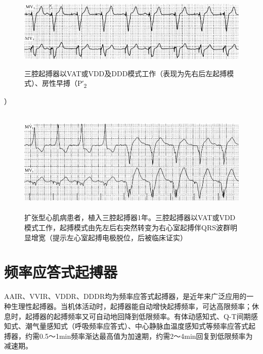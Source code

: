 \begin{figure}[!htbp]
 \centering
 \includegraphics[width=5.58333in,height=1.42708in]{./images/Image00641.jpg}
 \captionsetup{justification=centering}
 \caption{三腔起搏器以VAT或VDD及DDD模式工作（表现为先右后左起搏模式）、房性早搏（P′\textsubscript{2}}
 \label{fig38-38}
  \end{figure} 
）

\begin{figure}[!htbp]
 \centering
 \includegraphics[width=5.58333in,height=2in]{./images/Image00642.jpg}
 \captionsetup{justification=centering}
 \caption{扩张型心肌病患者，植入三腔起搏器1年。三腔起搏器以VAT或VDD模式工作，起搏模式由先左后右突然转变为右心室起搏伴QRS波群明显增宽（提示左心室起搏电极脱位，后被临床证实）}
 \label{fig38-39}
  \end{figure} 

\protect\hypertarget{text00045.htmlux5cux23subid503}{}{}

\section{频率应答式起搏器}

AAIR、VVIR、VDDR、DDDR均为频率应答式起搏器，是近年来广泛应用的一种生理性起搏器。当机体活动时，起搏器能自动增快起搏频率，可达高限频率；休息时，起搏器的起搏频率又可自动地回降到低限频率。有体动感知式、Q-T间期感知式、潮气量感知式（呼吸频率应答式）、中心静脉血温度感知式等频率应答式起搏器，约需0.5～1min频率渐达最高值为加速期，约需2～4min回复到低限频率为减速期。

\protect\hypertarget{text00045.htmlux5cux23subid504}{}{}

